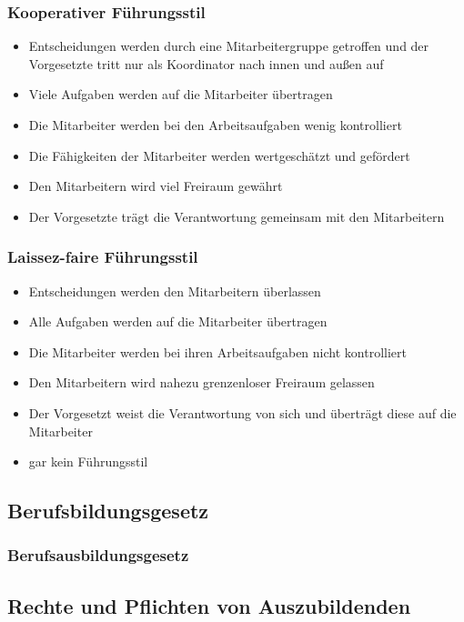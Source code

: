 \subsubsection{Kooperativer Führungsstil}
\begin{itemize}
	\item Entscheidungen werden durch eine Mitarbeitergruppe getroffen und der Vorgesetzte tritt nur als Koordinator nach innen und außen auf
	\item Viele Aufgaben werden auf die Mitarbeiter übertragen
	\item Die Mitarbeiter werden bei den Arbeitsaufgaben wenig kontrolliert
	\item Die Fähigkeiten der Mitarbeiter werden wertgeschätzt und gefördert
	\item Den Mitarbeitern wird viel Freiraum gewährt
	\item Der Vorgesetzte trägt die Verantwortung gemeinsam mit den Mitarbeitern
\end{itemize}

\subsubsection{Laissez-faire Führungsstil}
\begin{itemize}
	\item Entscheidungen werden den Mitarbeitern überlassen
	\item Alle Aufgaben werden auf die Mitarbeiter übertragen
	\item Die Mitarbeiter werden bei ihren Arbeitsaufgaben nicht kontrolliert
	\item Den Mitarbeitern wird nahezu grenzenloser Freiraum gelassen
	\item Der Vorgesetzt weist die Verantwortung von sich und überträgt diese auf die Mitarbeiter
	\item \ql gar kein Führungsstil\qr
\end{itemize}


\subsection{Berufsbildungsgesetz}

\subsubsection{Berufsausbildungsgesetz}


\subsection{Rechte und Pflichten von Auszubildenden}

